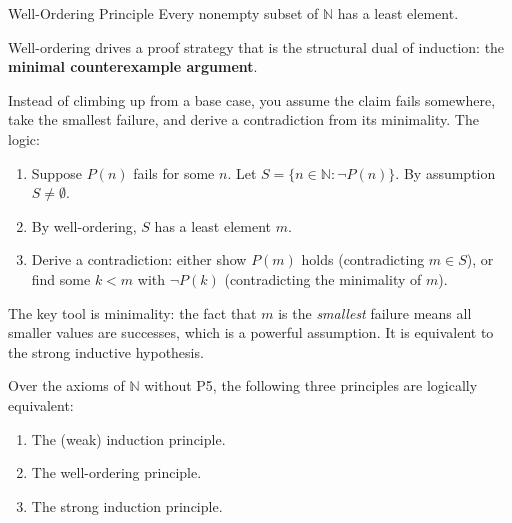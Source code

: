 \noindent\begin{propositionbox}{Well-Ordering Principle}
Every nonempty subset of $\mathbb{N}$ has a least element.
\end{propositionbox}
\label{sec:wellordering}

\begin{remark}
Well-ordering drives a proof strategy that is the structural dual of
induction: the \textbf{minimal counterexample argument}.

Instead of climbing up from a base case, you assume the claim fails
somewhere, take the smallest failure, and derive a contradiction from
its minimality. The logic:

\begin{enumerate}[itemsep=2pt]
  \item Suppose $P(n)$ fails for some $n$. Let
    $S = \{n \in \mathbb{N} : \neg P(n)\}$. By assumption $S \neq \emptyset$.
  \item By well-ordering, $S$ has a least element $m$.
  \item Derive a contradiction: either show $P(m)$ holds (contradicting
    $m \in S$), or find some $k < m$ with $\neg P(k)$ (contradicting
    the minimality of $m$).
\end{enumerate}

The key tool is minimality: the fact that $m$ is the \emph{smallest}
failure means all smaller values are successes, which is a powerful
assumption. It is equivalent to the strong inductive hypothesis.
\end{remark}

\begin{proposition}
\label{prop:induction-well-ordering-equivalent}
Over the axioms of $\mathbb{N}$ without P5, the following three
principles are logically equivalent:
\begin{enumerate}[itemsep=2pt]
  \item The (weak) induction principle.
  \item The well-ordering principle.
  \item The strong induction principle.
\end{enumerate}
\end{proposition}

\NoLocalDependencies

